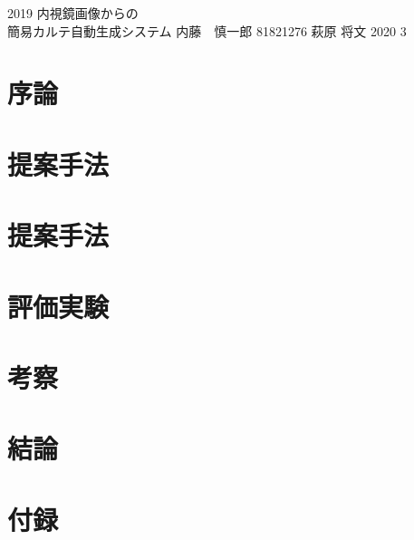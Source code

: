 \documentclass[a4j,12pt]{jreport}
\begin{document}
\begin{titlepage}
\thesis
{2019}                %
{内視鏡画像からの\\簡易カルテ自動生成システム}       %
{内藤　慎一郎}                %
{81821276}          %
{萩原 将文}         %
{2020}                %
{3} %
\end{titlepage}


\renewcommand{\thepage}{--\roman{page}--}

\jabstract


\eabstract{} %


\contents


\chapter{序論}


\chapter{提案手法}


\chapter{提案手法}


\chapter{評価実験}


\chapter{考察}


\chapter{結論}




\acknowledgment





\appendix
\chapter{付録}

\end{document}
